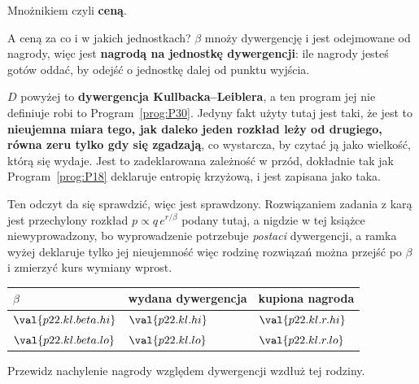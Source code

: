 \begin{fr}
\begin{ansblock}
Mnożnikiem \dash{} czyli \textbf{ceną}.
\end{ansblock}

A ceną za co i w jakich jednostkach? $\beta$ mnoży dywergencję i jest odejmowane
od nagrody, więc jest \textbf{nagrodą na jednostkę dywergencji}: ile nagrody
jesteś gotów oddać, by odejść o jednostkę dalej od punktu wyjścia.

\begin{rigourbox}
$D$ powyżej to \textbf{dywergencja Kullbacka--Leiblera}, a ten program jej nie
definiuje \dash{} robi to Program~\ref{prog:P30}. Jedyny fakt użyty tutaj jest
taki, że jest to \textbf{nieujemna miara tego, jak daleko jeden rozkład leży od
drugiego, równa zeru tylko gdy się zgadzają}, co wystarcza, by czytać ją jako
wielkość, którą się wydaje. Jest to zadeklarowana zależność w przód, dokładnie
tak jak Program~\ref{prog:P18} deklaruje entropię krzyżową, i jest zapisana jako
taka.
\end{rigourbox}
\end{fr}

\begin{fr}
Ten odczyt da się sprawdzić, więc jest sprawdzony. Rozwiązaniem zadania z karą
jest przechylony rozkład $p \propto q\,e^{r/\beta}$ \dash{} podany tutaj, a
nigdzie w tej książce niewyprowadzony, bo wyprowadzenie potrzebuje
\emph{postaci}
dywergencji, a ramka wyżej deklaruje tylko jej nieujemność \dash{} więc rodzinę
rozwiązań można przejść po $\beta$ i zmierzyć kurs wymiany wprost.

\begin{center}
\begin{tabular}{lll}
\toprule
$\beta$ & wydana dywergencja & kupiona nagroda \\
\midrule
$\val{p22.kl.beta.hi}$ & $\val{p22.kl.hi}$ & $\val{p22.kl.r.hi}$ \\
$\val{p22.kl.beta.lo}$ & $\val{p22.kl.lo}$ & $\val{p22.kl.r.lo}$ \\
\bottomrule
\end{tabular}
\end{center}

Przewidz nachylenie nagrody względem dywergencji wzdłuż tej rodziny.
\nextframe
\end{fr}

